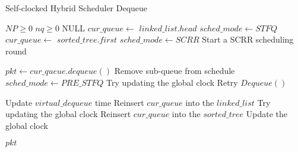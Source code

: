 \begin{algorithm}[t]
\caption{Self-clocked Hybrid Scheduler Dequeue}
\label{alg:hybrid-deq}
\begin{algorithmic}
\Require $NP \ge 0$
\Require $nq \ge 0$
\Return NULL
\EndIf
        \State $cur\_queue \gets$ $linked\_ list.head$
            \State $sched\_mode \gets STFQ$
        \EndIf  
    \Else
        \State $cur\_queue \gets$ $sorted\_tree.first$
            \State $sched\_mode \gets SCRR$
            \State Start a SCRR scheduling round
        \EndIf  
    \EndIf

\State $pkt \gets cur\_queue.dequeue()$
    \State Remove sub-queue from schedule
        \State $sched\_mode \gets PRE\_STFQ$      
    \EndIf
    \State Try updating the global clock
    \State Retry $Dequeue()$
\EndIf

\State Update $virtual\_dequeue$ time
        \State Reinsert $cur\_queue$ into the $linked\_list$ 
        \State Try updating the global clock
    \Else
        \State Reinsert $cur\_queue$ into the $sorted\_tree$ 
        \State Update the global clock
    \EndIf
\EndIf

\Return $pkt$
\EndFunction
\end{algorithmic}
\end{algorithm}

